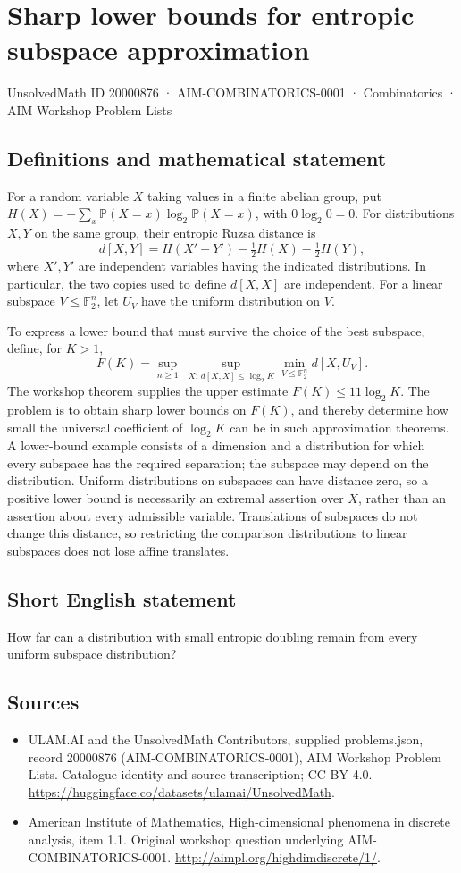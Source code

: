 \documentclass[11pt,a4paper]{article}
\begin{document}
\section*{Sharp lower bounds for entropic subspace approximation}\label{20000876}
{\small UnsolvedMath ID 20000876 · AIM-COMBINATORICS-0001 · Combinatorics · AIM Workshop Problem Lists}
\subsection{Definitions and mathematical statement}
For a random variable $X$ taking values in a finite abelian group, put
$H(X)=-\sum_x\mathbb P(X=x)\log_2\mathbb P(X=x)$, with $0\log_2 0=0$.
For distributions $X,Y$ on the same group, their entropic Ruzsa distance is
\[
 d[X,Y]=H(X'-Y')-\tfrac12 H(X)-\tfrac12 H(Y),
\]
where $X',Y'$ are independent variables having the indicated distributions.
In particular, the two copies used to define $d[X,X]$ are independent.
For a linear subspace $V\leq\mathbb F_2^n$, let $U_V$ have the uniform distribution on $V$.

To express a lower bound that must survive the choice of the best subspace, define, for $K>1$,
\[
 F(K)=\sup_{n\geq1}\ \sup_{X:\,d[X,X]\leq\log_2 K}
             \min_{V\leq\mathbb F_2^n}d[X,U_V].
\]
The workshop theorem supplies the upper estimate $F(K)\leq11\log_2 K$.
The problem is to obtain sharp lower bounds on $F(K)$, and thereby determine how small the universal coefficient of $\log_2 K$ can be in such approximation theorems.
A lower-bound example consists of a dimension and a distribution for which every subspace has the required separation; the subspace may depend on the distribution.
Uniform distributions on subspaces can have distance zero, so a positive lower bound is necessarily an extremal assertion over $X$, rather than an assertion about every admissible variable.
Translations of subspaces do not change this distance, so restricting the comparison distributions to linear subspaces does not lose affine translates.
\subsection{Short English statement}
How far can a distribution with small entropic doubling remain from every uniform subspace distribution?
\subsection{Sources}
\begin{itemize}
\item[S1] ULAM.AI and the UnsolvedMath Contributors, supplied problems.json, record 20000876 (AIM-COMBINATORICS-0001), AIM Workshop Problem Lists. Catalogue identity and source transcription; CC BY 4.0.
\url{https://huggingface.co/datasets/ulamai/UnsolvedMath}.
\item[S2] American Institute of Mathematics, High-dimensional phenomena in discrete analysis, item 1.1. Original workshop question underlying AIM-COMBINATORICS-0001.
\url{http://aimpl.org/highdimdiscrete/1/}.
\end{itemize}
\end{document}
